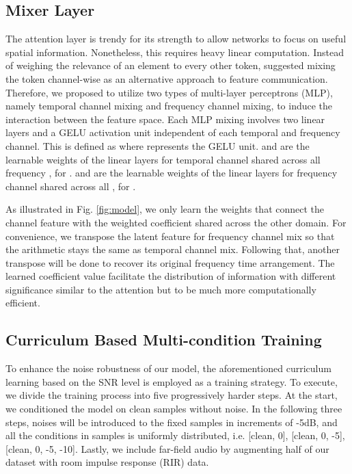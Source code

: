\documentclass{article}
\begin{document}
\subsection{Mixer Layer}
\label{ssec:convmixer}
The attention layer is trendy for its strength to allow networks to focus on useful spatial information. Nonetheless, this requires heavy linear computation. Instead of weighing the relevance of an element to every other token, \cite{lee2021fnet, tolstikhin2021mlp} suggested mixing the token channel-wise as an alternative approach to feature communication. Therefore, we proposed to utilize two types of multi-layer perceptrons (MLP), namely temporal channel mixing and frequency channel mixing, to induce the interaction between the feature space. Each MLP mixing involves two linear layers and a GELU activation unit independent of each temporal and frequency channel. This is defined as  where  represents the GELU unit.  and  are the learnable weights of the linear layers for temporal channel shared across all frequency , for .  and  are the learnable weights of the linear layers for frequency channel shared across all , for .

As illustrated in Fig. \ref{fig:model}, we only learn the weights that connect the channel feature with the weighted coefficient shared across the other domain. For convenience, we transpose the latent feature for frequency channel mix so that the arithmetic stays the same as temporal channel mix. Following that, another transpose will be done to recover its original frequency  time arrangement. The learned coefficient value facilitate the distribution of information with different significance similar to the attention but to be much more computationally efficient. 

\subsection{Curriculum Based Multi-condition Training}
\label{ssec:curriculum}

To enhance the noise robustness of our model, the aforementioned curriculum learning based on the SNR level is employed as a training strategy.
To execute, we divide the training process into five progressively harder steps. At the start, we conditioned the model on clean samples without noise. In the following three steps, noises will be introduced to the fixed  samples in increments of -5dB, and all the conditions in  samples is uniformly distributed, i.e. [clean, 0], [clean, 0, -5], [clean, 0, -5, -10]. Lastly, we include far-field audio by augmenting half of our dataset with room impulse response (RIR) data.
\end{document}
